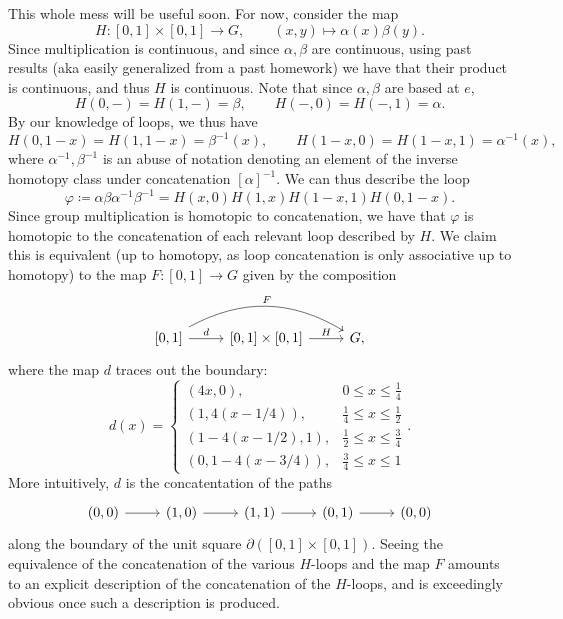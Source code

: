 \documentclass[11pt, letterpaper]{article}
\begin{document}
This whole mess will be useful soon. For now, consider the map
\[
	H : [0,1]\times [0,1] \to G,\qquad (x,y)\mapsto \alpha (x)\beta (y)
.\]
Since multiplication is continuous, and since $\alpha ,\beta $ are continuous, using past results (aka easily generalized from a past homework) we have that their product is continuous, and thus $H$ is continuous. Note that since $\alpha ,\beta $ are based at $e$,
\[
	H(0,-)=H(1,-)=\beta ,\qquad H(-,0)=H(-,1)=\alpha 
.\]
By our knowledge of loops, we thus have
\[
	H(0,1-x)=H(1,1-x)=\beta ^{-1}(x) ,\qquad H(1-x,0)=H(1-x,1)=\alpha ^{-1} (x),
\]
where $\alpha ^{-1},\beta ^{-1} $ is an abuse of notation denoting an element of the inverse homotopy class under concatenation $[\alpha ]^{-1} $. We can thus describe the loop
\[
	\varphi \coloneqq \alpha \beta\alpha ^{-1} \beta ^{-1} =H(x,0)H(1,x)H(1-x,1)H(0,1-x)
.\]
Since group multiplication is homotopic to concatenation, we have that $\varphi $ is homotopic to the concatenation of each relevant loop described by $H$. We claim this is equivalent (up to homotopy, as loop concatenation is only associative up to homotopy) to the map $F : [0,1] \to G$ given by the composition
\[\begin{tikzcd}[row sep = 2.5em, column sep = 2.5em]
\left[ 0,1 \right] \ar[" d ", r] \ar[" F ", bend left, rr]  & \left[ 0,1 \right] \times \left[ 0,1 \right] \ar[" H ", r]  & G,
\end{tikzcd}\]
where the map $d $ traces out the boundary:
\[
	d(x)=
	\begin{cases}
		(4x,0),&0\leq x\leq \frac{1}{4} \\
		(1,4(x-1/4)),&\frac{1}{4} \leq x\leq \frac{1}{2} \\
		(1-4(x-1/2),1),&\frac{1}{2} \leq x\leq \frac{3}{4} \\
		(0,1-4(x-3/4)),&\frac{3}{4} \leq x\leq 1
	\end{cases}
.\]
More intuitively, $d$ is the concatentation of the paths
\[\begin{tikzcd}[row sep = 2.5em, column sep = 2.5em]
	(0,0)\ar[r]  & (1,0)\ar[r]  & (1,1)\ar[r]  & (0,1)\ar[r] & (0,0)
\end{tikzcd}\]
along the boundary of the unit square $\partial( \left[ 0,1 \right] \times \left[ 0,1 \right] )$. Seeing the equivalence of the concatenation of the various $H$-loops and the map $F$ amounts to an explicit description of the concatenation of the $H$-loops, and is exceedingly obvious once such a description is produced.
\end{document}
